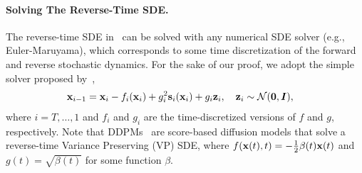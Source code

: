 \paragraph{Solving The Reverse-Time SDE.}The reverse-time SDE in~ can be solved with any numerical SDE solver (e.g., Euler-Maruyama), which corresponds to some time discretization of the forward and reverse stochastic dynamics.
For the sake of our proof, we adopt the simple solver proposed by~\citet{song2020score},
\begin{align}
    &{\mathbf{x}}_{i-1}={\mathbf{x}}_{i}-f_{i}({\mathbf{x}}_{i})+g_{i}^{2}{\mathbf{s}}_{i}({\mathbf{x}}_{i})+g_{i}{\mathbf{z}}_{i},\quad{\mathbf{z}}_{i}\sim\mathcal{N}({\bm{0}},{\bm{I}}),\label{eq:song_discretization}
\end{align}
where $i=T,\hdots,1$ and $f_{i}$ and $g_{i}$ are the time-discretized versions of $f$ and $g$, respectively.
Note that DDPMs~\citep{ho2020denoising} are score-based diffusion models that solve a reverse-time Variance Preserving (VP) SDE, where $f({\mathbf{x}}(t),t)=-\frac{1}{2}\beta(t){\mathbf{x}}(t)$ and $g(t)=\sqrt{\beta(t)}$ for some function $\beta$.

